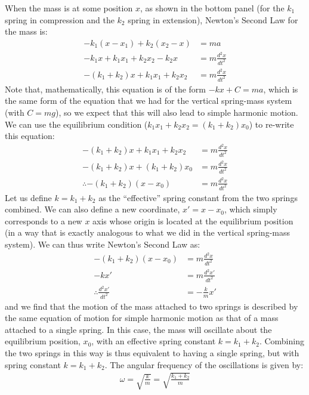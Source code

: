 When the mass is at some position $x$, as shown in the bottom panel (for the $k_1$ spring in compression and the $k_2$ spring in extension), Newton's Second Law for the mass is:
\begin{align*}
-k_1(x-x_1) + k_2 (x_2 - x) &= m a \\
-k_1x +k_1x_1 + k_2 x_2 - k_2 x &= m \frac{d^2x}{dt^2}\\
-(k_1+k_2)x  + k_1x_1 + k_2 x_2&= m \frac{d^2x}{dt^2}
\end{align*} 
Note that, mathematically, this equation is of the form $-kx + C =ma$, which is the same form of the equation that we had for the vertical spring-mass system (with $C=mg$), so we expect that this will also lead to simple harmonic motion. We can use the equilibrium condition ($k_1x_1+k_2x_2 =(k_1+k_2)x_0$) to re-write this equation:
\begin{align*}
-(k_1+k_2)x  + k_1x_1 + k_2 x_2&= m \frac{d^2x}{dt^2}\\
-(k_1+k_2)x  + (k_1+k_2)x_0&= m \frac{d^2x}{dt^2}\\
\therefore -(k_1+k_2) (x-x_0) &= m \frac{d^2x}{dt^2}
\end{align*} 
Let us define $k=k_1+k_2$ as the ``effective'' spring constant from the two springs combined. We can also define a new coordinate, $x' = x-x_0$, which simply corresponds to a new $x$ axis whose origin is located at the equilibrium position (in a way that is exactly analogous to what we did in the vertical spring-mass system). We can thus write Newton's Second Law as:
\begin{align*}
-(k_1+k_2) (x-x_0) &= m \frac{d^2x}{dt^2}\\
 -kx' &= m \frac{d^2x'}{dt^2}\\
 \therefore \frac{d^2x'}{dt^2} &= -\frac{k}{m}x'
\end{align*}
and we find that the motion of the mass attached to two springs is described by the same equation of motion for simple harmonic motion as that of a mass attached to a single spring. In this case, the mass will oscillate about the equilibrium position, $x_0$, with an effective spring constant $k=k_1+k_2$. Combining the two springs in this way is thus equivalent to having a single spring, but with spring constant $k=k_1+k_2$. The angular frequency of the oscillations is given by:
\begin{align*}
\omega = \sqrt{\frac{k}{m}}=\sqrt{\frac{k_1+k_2}{m}}
\end{align*}

